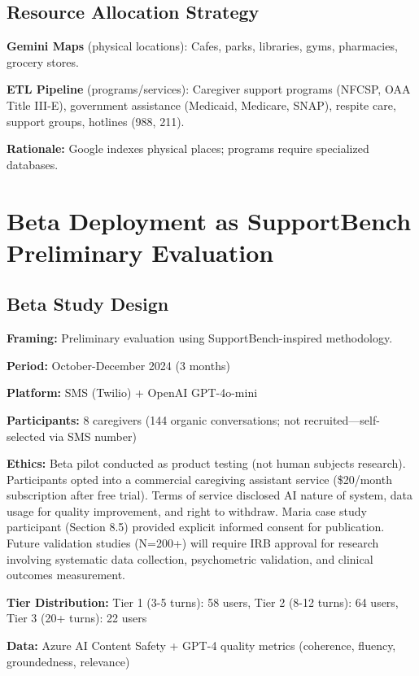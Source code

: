 \documentclass{article}
\begin{document}
%
\subsection{Resource Allocation Strategy}%
\label{subsec:ResourceAllocationStrategy}%
\textbf{Gemini Maps} (physical locations): Cafes, parks, libraries, gyms, pharmacies, grocery stores.

\textbf{ETL Pipeline} (programs/services): Caregiver support programs (NFCSP, OAA Title III-E), government assistance (Medicaid, Medicare, SNAP), respite care, support groups, hotlines (988, 211).

\textbf{Rationale:} Google indexes physical places; programs require specialized databases.

%
\section{Beta Deployment as SupportBench Preliminary Evaluation}%
\label{sec:BetaDeploymentasSupportBenchPreliminaryEvaluation}%
%
\subsection{Beta Study Design}%
\label{subsec:BetaStudyDesign}%
\textbf{Framing:} Preliminary evaluation using SupportBench-inspired methodology.

\textbf{Period:} October-December 2024 (3 months)

\textbf{Platform:} SMS (Twilio) + OpenAI GPT-4o-mini

\textbf{Participants:} 8 caregivers (144 organic conversations; not recruited—self-selected via SMS number)

\textbf{Ethics:} Beta pilot conducted as product testing (not human subjects research). Participants opted into a commercial caregiving assistant service (\$20/month subscription after free trial). Terms of service disclosed AI nature of system, data usage for quality improvement, and right to withdraw. Maria case study participant (Section 8.5) provided explicit informed consent for publication. Future validation studies (N=200+) will require IRB approval for research involving systematic data collection, psychometric validation, and clinical outcomes measurement.

\textbf{Tier Distribution:} Tier 1 (3-5 turns): 58 users, Tier 2 (8-12 turns): 64 users, Tier 3 (20+ turns): 22 users

\textbf{Data:} Azure AI Content Safety + GPT-4 quality metrics (coherence, fluency, groundedness, relevance)
\end{document}
